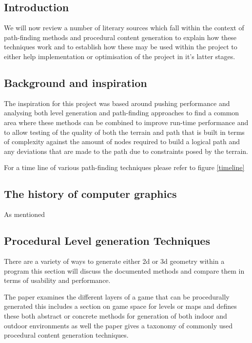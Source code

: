 
\setlength\parindent{0cm}

\subsection{Introduction}
We will now review a number of literary sources which fall within the context of path-finding methods and procedural content generation to explain how these techniques work and to establish how these may be used within the project to either help implementation or optimisation of the project in it's latter stages.  


\subsection{Background and inspiration}
The inspiration for this project was based around pushing performance and analysing both level generation and path-finding approaches to find a common area where these methods can be combined to improve run-time performance and to allow testing of the quality of both the terrain and path that is built in terms of complexity against the amount of nodes required to build a logical path and any deviations that are made to the path due to constraints posed by the terrain. 

For a time line of various path-finding techniques please refer to figure \ref{timeline}

\subsection{The history of computer graphics}
As mentioned  
\subsection{Procedural Level generation Techniques}
There are a variety of ways to generate either 2d or 3d geometry within a program this section will discuss the documented methods and compare them in terms of usability and performance.

The paper \cite{LG-Survey} examines the different layers of a game that can be procedurally generated this includes a section on game space for levels or maps and defines these both abstract or concrete methods for generation of both indoor and outdoor environments as well the paper gives a taxonomy of commonly used procedural content generation techniques.  

